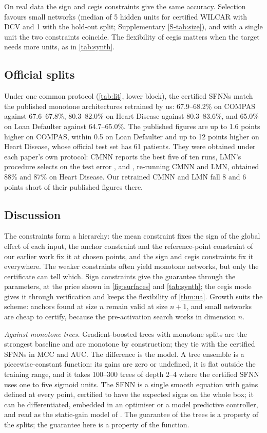 \documentclass[preprint,12pt,authoryear]{elsarticle}
\begin{document}
On real data the sign and cegis constraints give the same accuracy. Selection favours small networks (median of 5
hidden units for certified WILCAR with DCV and 1 with the hold-out split; Supplementary \cref{S-tab:size}), and with a
single unit the two constraints coincide. The flexibility of cegis matters when the target needs more units, as in
\cref{tab:synth}.

\subsection{Official splits}\label{sec:lit}
Under one common protocol (\cref{tab:lit}, lower block), the certified SFNNs match the published monotone architectures
retrained by us: 67.9--68.2\% on COMPAS against 67.6--67.8\%, 80.3--82.0\% on Heart Disease against 80.3--83.6\%, and
65.0\% on Loan Defaulter against 64.7--65.0\%. The published figures are up to 1.6 points higher on COMPAS, within 0.5 on
Loan Defaulter and up to 12 points higher on Heart Disease, whose official test set has 61 patients. They were obtained under each paper's own protocol: CMNN reports the best five of ten runs, LMN's procedure selects on
the test error \citep{Igel2024}, and \citet{PoloMolina2026kan}, re-running CMNN and LMN, obtained 88\% and 87\% on Heart
Disease. Our retrained CMNN and LMN fall 8 and 6 points short of their published figures there.

\subsection{Discussion}\label{sec:discussion}
The constraints form a hierarchy: the mean constraint fixes the sign of the global effect of each input, the anchor
constraint and the reference-point constraint of our earlier work fix it at chosen points, and the sign and cegis
constraints fix it everywhere. The weaker constraints often yield monotone networks, but only the certificate can tell
which. Sign constraints give the guarantee through the parameters, at the price shown in \cref{fig:surfaces} and
\cref{tab:synth}; the cegis mode gives it through verification and keeps the flexibility of \cref{thm:ua}. Growth suits the
scheme: anchors found at size $n$ remain valid at size $n+1$, and small networks are cheap to certify, because the
pre-activation search works in dimension $n$.

\emph{Against monotone trees.} Gradient-boosted trees with monotone splits are the strongest baseline and are monotone
by construction; they tie with the certified SFNNs in MCC and AUC. The difference is the model. A tree ensemble is a
piecewise-constant function: its gains are zero or undefined, it is flat outside the training range, and it takes
100--300 trees of depth 2--4 where the certified SFNN uses one to five sigmoid units. The SFNN is a single smooth
equation with gains defined at every point, certified to have the expected signs on the whole box; it can be
differentiated, embedded in an optimiser or a model predictive controller, and read as the static-gain model of
\citet{Sa2026}. The guarantee of the trees is a property of the splits; the guarantee here is a property of the
function.
\end{document}
